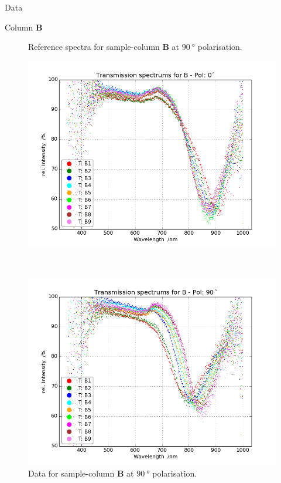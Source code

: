 \begin{appendix}
\begin{chapter}{Data}
\begin{section}{Column \textbf{B}}
\begin{figure}[ht!]
\begin{minipage}{.92\textwidth}
          \caption{Reference spectra for sample-column \textbf{B} at
              $\SI{90}{\degree}$ polarisation.}
          \label{fig:Refspec_BPol90}
        \end{minipage}
      \end{figure}
      \newpage
      \begin{figure}[ht!]
        \centering
        \begin{minipage}{.92\textwidth}
          \centering
          \includegraphics[width=\textwidth]{Figures/TransspecRAW_BPol0.png}
          \caption{Data for sample-column \textbf{B} at $\SI{0}{\degree}$
              polarisation.}
          \label{fig:TransspecRAW_BPol0}
        \end{minipage}\\
        \begin{minipage}{.92\textwidth}
          \centering
          \includegraphics[width=\textwidth]{Figures/TransspecRAW_BPol90.png}
          \caption{Data for sample-column \textbf{B} at $\SI{90}{\degree}$
              polarisation.}
          \label{fig:TransspecRAW_BPol90}
        \end{minipage}
      \end{figure}
      

\end{section}
\end{chapter}
\end{appendix}
